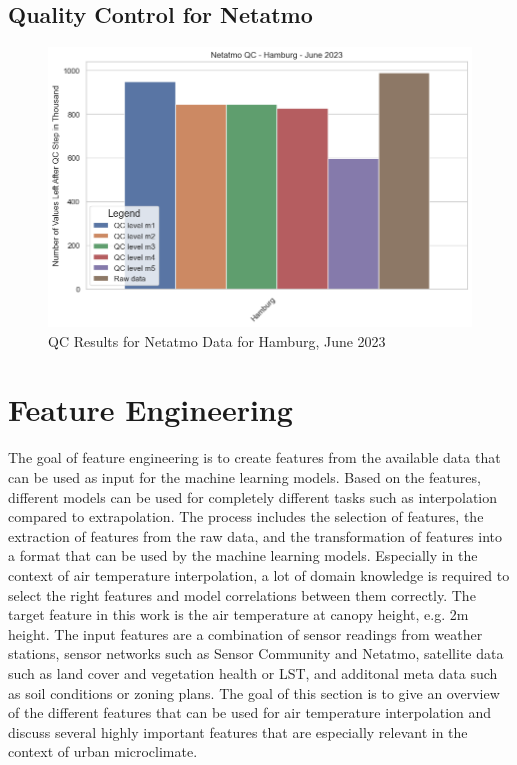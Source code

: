 \subsection{Quality Control for Netatmo}

\begin{figure}[htp]
    \centering
    \includegraphics[width=1\textwidth]{images/netatmo_qc_june_23.png}
    \caption{QC Results for Netatmo Data for Hamburg, June 2023}
    \label{fig:qc netatmo june 23}
\end{figure}

\section{Feature Engineering}
\label{sec:feature_engineering}

The goal of feature engineering is to create features from the available data that can be used as input for the machine learning models. Based on the features, different models can be used for completely different tasks such as interpolation compared to extrapolation. The process includes the selection of features, the extraction of features from the raw data, and the transformation of features into a format that can be used by the machine learning models.
Especially in the context of air temperature interpolation, a lot of domain knowledge is required to select the right features and model correlations between them correctly. The target feature in this work is the air temperature at canopy height, e.g. 2m height. The input features are a combination of sensor readings from weather stations, sensor networks such as Sensor Community and Netatmo, satellite data such as land cover and vegetation health or LST, and additonal meta data such as soil conditions or zoning plans. The goal of this section is to give an overview of the different features that can be used for air temperature interpolation and discuss several highly important features that are especially relevant in the context of urban microclimate.

